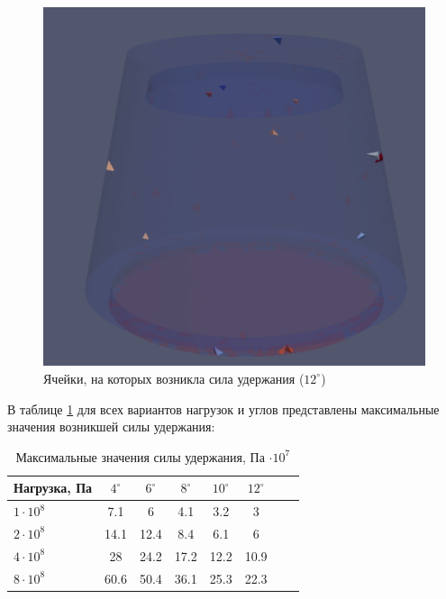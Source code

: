 \documentclass[a4paper, 14pt]{extreport}
\begin{document}
\begin{figure}[H]
	\center
	\includegraphics[scale=0.6]{pictures_diploma/push4-12deg.png}
	\caption{Ячейки, на которых возникла сила удержания ($12^{\circ}$)}
	\label{fig: push4-12deg}
\end{figure}

В таблице \ref{tab: table1} для всех вариантов нагрузок и 
углов представлены максимальные значения возникшей силы 
удержания:

\begin{table}[H]
\captionsetup{width=1.5\textwidth}
\centering
\caption{Максимальные значения силы удержания,  
Па $\cdot 10^7$}
\begin{tabular}{l*{6}{c}r}
Нагрузка, Па              & $4^{\circ}$ & $6^{\circ}$ & $8^{\circ}$ & $10^{\circ}$ & $12^{\circ}$ \\
\hline
$1 \cdot 10^8$ 	& 7.1 & 6 & 4.1 & 3.2 & 3  \\
$2 \cdot 10^8$     & 14.1 & 12.4 & 8.4 & 6.1 & 6  \\
$4 \cdot 10^8$     & 28 & 24.2 & 17.2 & 12.2 &  10.9  \\
$8 \cdot 10^8$     & 60.6 & 50.4 & 36.1 & 25.3 &  22.3  \\
\end{tabular}

\label{tab: table1}
\end{table}
\end{document}

